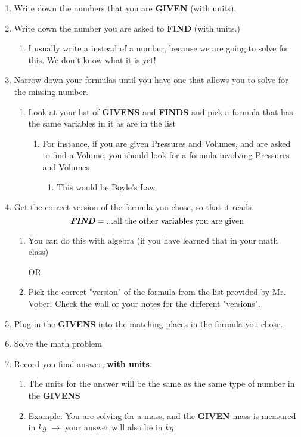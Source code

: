 \documentclass[../../main.tex]{subfiles}
\begin{document}
\begin{enumerate}
	\item Write down the numbers that you are \textbf{GIVEN} (with units).
	\item Write down the number you are asked to \textbf{FIND} (with units.)
	      \begin{enumerate}
		      \item I usually write a {\huge\textbf{}} instead of a number, because we are going to solve for this.  We don't know what it is yet!
	      \end{enumerate}
	\item Narrow down your formulas until you have one that allows you to solve for the missing number.
	      \begin{enumerate}
		      \item Look at your list of \textbf{GIVENS} and \textbf{FINDS} and pick a formula that has the same variables in it as are in the list
		            \begin{enumerate}
			            \item For instance, if you are given Pressures and Volumes, and are asked to find a Volume, you should look for a formula involving Pressures and Volumes
			                  \begin{enumerate}
				                  \item This would be Boyle's Law
			                  \end{enumerate}
		            \end{enumerate}
	      \end{enumerate}
	\item Get the correct version of the formula you chose, so that it reads \[\textbf{\emph{FIND}} = ...\text{all the other variables you are given}\]
	      \begin{enumerate}
		      \item You can do this with algebra (if you have learned that in your math class)

		            OR

		      \item Pick the correct "version" of the formula from the list provided by Mr. Vober.  Check the wall or your notes for the different "versions".
	      \end{enumerate}
	\item Plug in the \textbf{GIVENS} into the matching places in the formula you chose.
	\item Solve the math problem
	\item Record you final answer, \textbf{with units}.
	      \begin{enumerate}
		      \item The units for the answer will be the same as the same type of number in the \textbf{GIVENS}
		      \item Example: You are solving for a mass, and the \textbf{GIVEN} mass is measured in $kg$ $\rightarrow$ your answer will also be in $kg$
	      \end{enumerate}
\end{enumerate}
\end{document}
